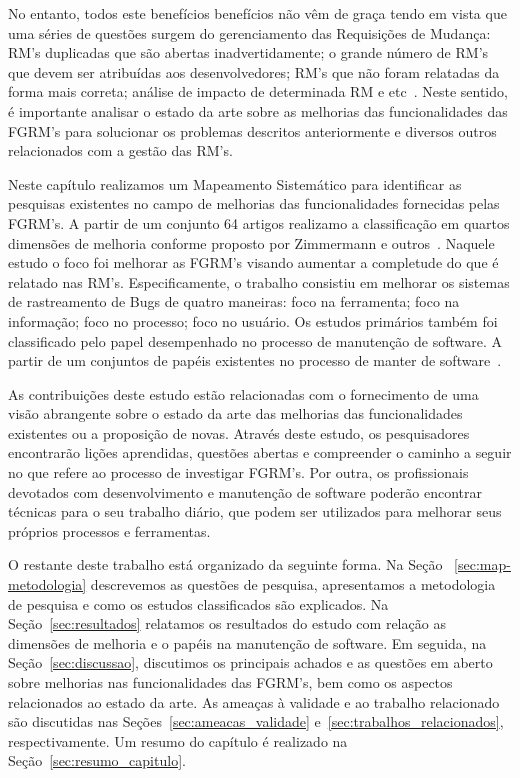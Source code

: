 No entanto, todos este benefícios benefícios não vêm de graça tendo em vista que
uma séries de questões surgem do gerenciamento das Requisições de Mudança: RM's
duplicadas que são abertas inadvertidamente; o grande número de RM's que devem
ser atribuídas aos desenvolvedores; RM's que não foram relatadas da forma mais
correta; análise de impacto de determinada RM e
etc~\cite{cavalcanti2014challenges}. Neste sentido, é importante analisar o
estado da arte sobre as melhorias das funcionalidades das FGRM's para solucionar
os problemas descritos anteriormente e diversos outros relacionados com a gestão
das RM's.

Neste capítulo realizamos um Mapeamento Sistemático para identificar as
pesquisas existentes no campo de melhorias das funcionalidades fornecidas pelas
FGRM's. A partir de um conjunto 64 artigos realizamo a classificação em quartos
dimensões de melhoria conforme proposto por Zimmermann e
outros~\cite{zimmermann2009improving}. Naquele estudo o foco foi melhorar as
FGRM's visando aumentar a completude do que é relatado nas RM's.
Especificamente, o trabalho consistiu em melhorar os sistemas de rastreamento de
Bugs de quatro maneiras: foco na ferramenta; foco na informação; foco no
processo; foco no usuário. Os estudos primários também foi classificado pelo
papel desempenhado no processo de manutenção de software. A partir de um
conjuntos de papéis existentes no processo de manter de
software~\cite{Polo1999}.

As contribuições deste estudo estão relacionadas com o fornecimento de uma visão
abrangente sobre o estado da arte das melhorias das funcionalidades existentes
ou a proposição de novas. Através deste estudo, os pesquisadores encontrarão
lições aprendidas, questões abertas e compreender o caminho a seguir no que
refere ao processo de investigar FGRM's. Por outra, os profissionais devotados
com desenvolvimento e manutenção de software poderão encontrar técnicas para o
seu trabalho diário, que podem ser utilizados para melhorar seus próprios
processos e ferramentas.

O restante deste trabalho está organizado da seguinte forma. Na Seção
~\ref{sec:map-metodologia} descrevemos as questões de pesquisa, apresentamos a
metodologia de pesquisa e como os estudos classificados são explicados.  Na
Seção~\ref{sec:resultados} relatamos os resultados do estudo com relação as
dimensões de melhoria e o papéis na manutenção de software. Em seguida, na
Seção~\ref{sec:discussao}, discutimos os principais achados e as questões em aberto
sobre melhorias nas funcionalidades das FGRM's, bem como os aspectos
relacionados ao estado da arte. As ameaças à validade e ao trabalho
relacionado são discutidas nas Seções~\ref{sec:ameacas_validade}
e~\ref{sec:trabalhos_relacionados}, respectivamente. Um resumo do capítulo é
realizado na Seção~\ref{sec:resumo_capitulo}.

